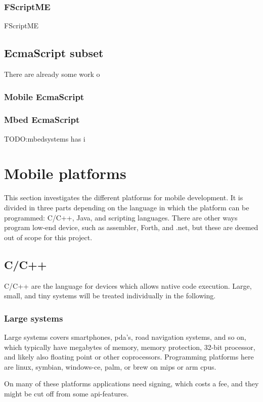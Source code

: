 \subsubsection{FScriptME}
FScriptME

\subsection{EcmaScript subset}
There are already some work o
\subsubsection{Mobile EcmaScript}
\subsubsection{Mbed EcmaScript}
TODO:mbedsystems has i

\section{Mobile platforms}

This section investigates the different platforms for mobile development. 
It is divided in three parts depending on the language in which the platform can be programmed:
C/C++, Java, and scripting languages.
There are other ways program low-end device, such as assembler, Forth, and .net, but these are deemed out of scope for this project.


\subsection{C/C++}
C/C++ are the language for devices which allows native code execution.
Large, small, and tiny systems will be treated individually in the following.

\subsubsection{Large systems}
Large systems covers smartphones, pda's, road navigation systems, and so on, which typically have megabytes of memory, memory protection, 32-bit processor, and likely also floating point or other coprocessors. Programming platforms here are linux, symbian, windows-ce, palm, or brew on mips or arm cpus. 

On many of these platforms applications need signing, which costs a fee, and they might be cut off from some api-features.

